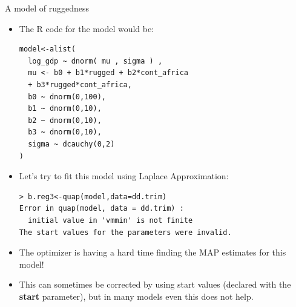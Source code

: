 \documentclass[handout]{beamer}
\begin{document}
\begin{frame}[fragile]{A model of ruggedness}
\scriptsize{

\begin{itemize}
\item The R code for the model would be:

\begin{verbatim}
model<-alist(
  log_gdp ~ dnorm( mu , sigma ) ,
  mu <- b0 + b1*rugged + b2*cont_africa 
  + b3*rugged*cont_africa,
  b0 ~ dnorm(0,100),
  b1 ~ dnorm(0,10),
  b2 ~ dnorm(0,10),
  b3 ~ dnorm(0,10),
  sigma ~ dcauchy(0,2)
) 
\end{verbatim}

\item Let's try to fit this model using Laplace Approximation:

\begin{verbatim}
> b.reg3<-quap(model,data=dd.trim)
Error in quap(model, data = dd.trim) : 
  initial value in 'vmmin' is not finite
The start values for the parameters were invalid. 
\end{verbatim}

\item The optimizer is having a hard time finding the MAP estimates for this model!

\item This can sometimes be corrected by using start values (declared with the \textbf{start} parameter), but in many models even this does not help.

\end{itemize}


} 
\end{frame}
\end{document}
